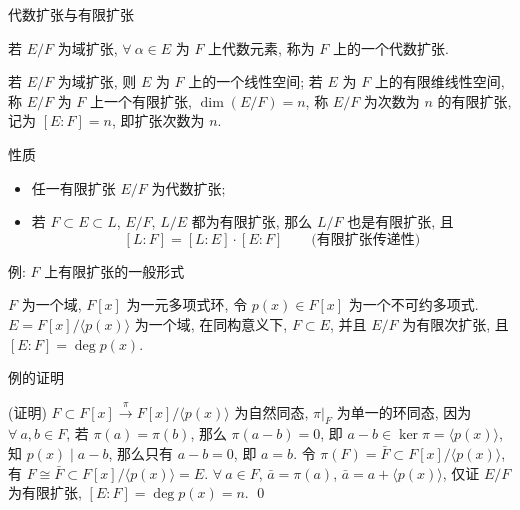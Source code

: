 
\begin{frame}{代数扩张与有限扩张}

\begin{Def}[代数扩张]
若 $E/F$ 为域扩张, $\forall\ \alpha \in E$ 为 $F$ 上代数元素,
称为 $F$ 上的一个代数扩张.
\end{Def}

\pause

\begin{Def}[有限扩张]
若 $E/F$ 为域扩张, 则 $E$ 为 $F$ 上的一个线性空间;
若 $E$ 为 $F$ 上的有限维线性空间, 称 $E/F$ 为 $F$ 上一个有限扩张,
$\dim(E/F) = n$, 称 $E/F$ 为次数为 $n$ 的有限扩张, 记为 $[E:F] = n$,
即扩张次数为 $n$.
\end{Def}

\end{frame}


\begin{frame}{性质}

\begin{itemize}
\item {} 任一有限扩张 $E/F$ 为代数扩张;
\item {} 若 $F \subset E \subset L$, $E/F$, $L/E$ 都为有限扩张, 那么
  $L/F$ 也是有限扩张, 且
  \[ [L:F] = [L:E] \cdot [E:F] \qquad \text{(有限扩张传递性)} \]
\end{itemize}

\end{frame}


\begin{frame}{例: $F$ 上有限扩张的一般形式}

\begin{eg}[$F$ 上有限扩张的一般形式]
$F$ 为一个域, $F[x]$ 为一元多项式环,
令 $p(x) \in F[x]$ 为一个不可约多项式.
$E = F[x]/\langle p(x) \rangle$ 为一个域, 在同构意义下, $F \subset E$,
并且 $E/F$ 为有限次扩张, 且 $[E:F] = \deg p(x)$.
\end{eg}

\end{frame}


\begin{frame}{例的证明}

\startproof[bg=yellow, fg=red](证明)
$F \subset F[x] \xrightarrow{\ \pi\ } F[x]/\langle p(x) \rangle$ 为自然同态,
$\pi|_F$ 为单一的环同态,
因为 $\forall\ a, b \in F$, 若 $\pi(a) = \pi(b)$, 那么 $\pi(a - b) = 0$,
即 $a - b \in \ker \pi = \langle p(x) \rangle$, 知 $p(x) \mid a - b$,
那么只有 $a - b = 0$, 即 $a = b$.
令 $\pi(F) = \bar{F} \subset F[x]/\langle p(x) \rangle$,
有 $F \cong \bar{F} \subset F[x]/\langle p(x) \rangle = E$.
$\forall\ a \in F$, $\bar{a} = \pi(a)$, $\bar{a} = a + \langle p(x) \rangle$,
仅证 $E/F$ 为有限扩张, $[E:F] = \deg p(x) = n$.
\qed

\end{frame}

